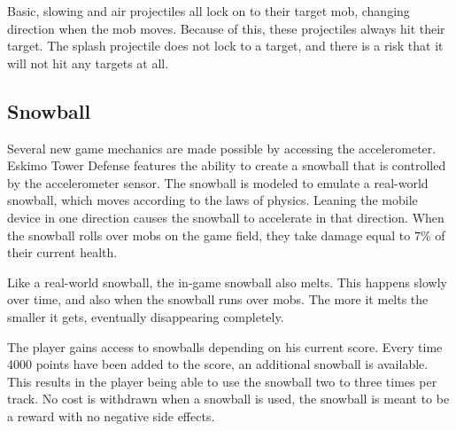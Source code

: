 Basic, slowing and air projectiles all lock on to their target mob, changing direction when the mob moves. Because of this, these projectiles always hit their target. The splash projectile does not lock to a target, and there is a risk that it will not hit any targets at all.

\subsection{Snowball}

Several new game mechanics are made possible by accessing the accelerometer. Eskimo Tower Defense features the ability to create a snowball that is controlled by the accelerometer sensor. The snowball is modeled to emulate a real-world snowball, which moves according to the laws of physics. Leaning the mobile device in one direction causes the snowball to accelerate in that direction. When the snowball rolls over mobs on the game field, they take damage equal to \begin{math}7\%\end{math} of their current health.

Like a real-world snowball, the in-game snowball also melts. This happens slowly over time, and also when the snowball runs over mobs. The more it melts the smaller it gets, eventually disappearing completely.

The player gains access to snowballs depending on his current score. Every time 4000 points have been added to the score, an additional snowball is available. This results in the player being able to use the snowball two to three times per track. No cost is withdrawn when a snowball is used, the snowball is meant to be a reward with no negative side effects.